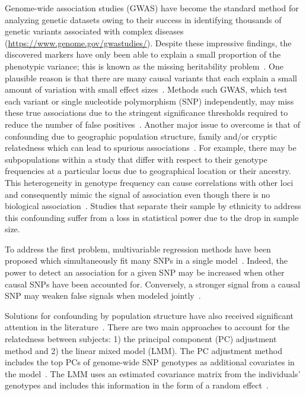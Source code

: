 \documentclass[12pt,letter]{article}\usepackage[]{graphicx}\usepackage[]{color}
\begin{document}
Genome-wide association studies (GWAS) have become the standard method for analyzing genetic datasets owing to their success in identifying thousands of genetic variants associated with complex diseases (\url{https://www.genome.gov/gwastudies/}).
Despite these impressive findings, the discovered markers have only been able to explain a small proportion of the phenotypic variance; this is known as the missing heritability problem~\citep{manolio2009finding}.
One plausible reason is that there are many causal variants that each explain a small amount of variation with small effect sizes~\citep{yang2010common}.
Methods such GWAS, which test each variant or single nucleotide polymorphism (SNP) independently, may miss these true associations due to the stringent significance thresholds required to reduce the number of false positives~\citep{manolio2009finding}.
Another major issue to overcome is that of confounding due to geographic population structure, family and/or cryptic relatedness which can lead to spurious associations~\citep{astle2009population}.
For example, there may be subpopulations within a study that differ with respect to their genotype frequencies at a particular locus due to geographical location or their ancestry.
This heterogeneity in genotype frequency can cause correlations with other loci and consequently mimic the signal of association even though there is no biological association~\citep{song2015testing,marchini2004effects}.
Studies that separate their sample by ethnicity to address this confounding suffer from a loss in statistical power due to the drop in sample size.


To address the first problem, multivariable regression methods have been proposed which simultaneously fit many SNPs in a single model~\citep{hoggart2008simultaneous,li2010bayesian}. Indeed, the power to detect an association for a given SNP may be increased when other causal SNPs have been accounted for. Conversely, a stronger signal from a causal SNP may weaken false signals when modeled jointly~\citep{hoggart2008simultaneous}.

Solutions for confounding by population structure have also received significant attention in the literature~\citep{lippert2011fast,kang2010variance,yu2006unified,eu2014comparison}.
There are two main approaches to account for the relatedness between subjects: 1) the principal component (PC) adjustment method and 2) the linear mixed model (LMM).
The PC adjustment method includes the top PCs of genome-wide SNP genotypes as additional covariates in the model~\citep{price2006principal}.
The LMM uses an estimated covariance matrix from the individuals' genotypes and includes this information in the form of a random effect~\cite{astle2009population}.
\end{document}
